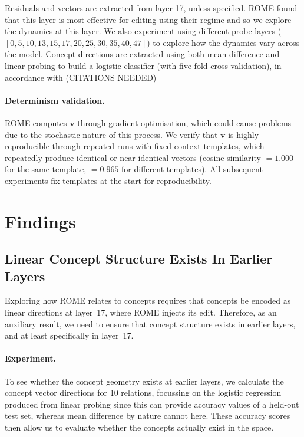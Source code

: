 \documentclass[11pt,a4paper]{article}
\newcommand{\vv}{\mathbf{v}}
\newcommand{\abs}[1]{\lvert #1 \rvert}
\newcommand{\cosim}{\abs{\cos(\cdot,\cdot)}}
\begin{document}
Residuals and vectors are extracted from layer 17, unless specified. ROME found that this layer is most effective for editing using their regime and so we explore the dynamics at this layer. We also experiment using different probe layers ($[0, 5, 10, 13, 15, 17, 20, 25, 30, 35, 40, 47]$) to explore how the dynamics vary across the model.
Concept directions are extracted using both mean-difference and linear probing to build a logistic classifier (with five fold cross validation), in accordance with (CITATIONS NEEDED)

\paragraph{Determinism validation.}
ROME computes $\vv$ through gradient optimisation, which could cause problems due to the stochastic nature of this process. We verify that $\vv$ is highly reproducible through repeated runs with fixed context templates, which repeatedly produce identical or near-identical vectors (cosine similarity $= 1.000$ for the same template, $= 0.965$ for different templates).
All subsequent experiments fix templates at the start for reproducibility.


\section{Findings}
\label{sec:results}

\subsection{Linear Concept Structure Exists In Earlier Layers}
\label{sec:exp1}

Exploring how ROME relates to concepts requires that concepts be encoded as linear directions at layer~17, where ROME injects its edit. Therefore, as an auxiliary result, we need to ensure that concept structure exists in earlier layers, and at least specifically in layer~17. 

\paragraph{Experiment.}
To see whether the concept geometry exists at earlier layers, we calculate the concept vector directions for 10 relations, focussing on the logistic regression produced from linear probing since this can provide accuracy values of a held-out test set, whereas mean difference by nature cannot here. These accuracy scores then allow us to evaluate whether the concepts actually exist in the space.
\end{document}
